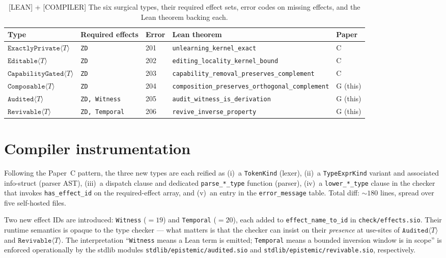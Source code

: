 \documentclass{article}
\newcommand{\ExactlyPrivate}[1]{\texttt{ExactlyPrivate}\langle #1 \rangle}
\newcommand{\Editable}[1]{\texttt{Editable}\langle #1 \rangle}
\newcommand{\CapabilityGated}[1]{\texttt{CapabilityGated}\langle #1 \rangle}
\newcommand{\Composable}[1]{\texttt{Composable}\langle #1 \rangle}
\newcommand{\Audited}[1]{\texttt{Audited}\langle #1 \rangle}
\newcommand{\Revivable}[1]{\texttt{Revivable}\langle #1 \rangle}
\begin{document}
\begin{table}[h]
\centering
\caption{[LEAN] + [COMPILER] The six surgical types, their required effect sets, error codes
         on missing effects, and the Lean theorem backing each.}
\label{tab:types}
\begin{tabular}{lllll}
\toprule
Type & Required effects & Error & Lean theorem & Paper \\
\midrule
$\ExactlyPrivate{T}$ & \texttt{ZD}            & 201 & \texttt{unlearning\_kernel\_exact}                  & C \\
$\Editable{T}$       & \texttt{ZD}            & 202 & \texttt{editing\_locality\_kernel\_bound}           & C \\
$\CapabilityGated{T}$& \texttt{ZD}            & 203 & \texttt{capability\_removal\_preserves\_complement} & C \\
$\Composable{T}$     & \texttt{ZD}            & 204 & \texttt{composition\_preserves\_orthogonal\_complement} & G (this) \\
$\Audited{T}$        & \texttt{ZD, Witness}   & 205 & \texttt{audit\_witness\_is\_derivation}             & G (this) \\
$\Revivable{T}$      & \texttt{ZD, Temporal}  & 206 & \texttt{revive\_inverse\_property}                  & G (this) \\
\bottomrule
\end{tabular}
\end{table}

\section{Compiler instrumentation}

Following the Paper~C pattern, the three new types are each reified
as (i)~a \texttt{TokenKind} (lexer), (ii)~a \texttt{TypeExprKind}
variant and associated info-struct (parser AST), (iii)~a dispatch clause
and dedicated \texttt{parse\_*\_type} function (parser), (iv)~a
\texttt{lower\_*\_type} clause in the checker that invokes
\texttt{has\_effect\_id} on the required-effect array, and (v)~an entry
in the \texttt{error\_message} table.  Total diff: $\sim 180$ lines,
spread over five self-hosted files.

Two new effect IDs are introduced:
\texttt{Witness} ($=19$) and \texttt{Temporal} ($=20$), each added to
\texttt{effect\_name\_to\_id} in \texttt{check/effects.sio}.  Their
runtime semantics is opaque to the type checker --- what matters is
that the checker can insist on their \emph{presence} at use-sites of
$\Audited{T}$ and $\Revivable{T}$.  The interpretation ``\texttt{Witness}
means a Lean term is emitted; \texttt{Temporal} means a bounded
inversion window is in scope'' is enforced operationally by the
stdlib modules \texttt{stdlib/epistemic/audited.sio} and
\texttt{stdlib/epistemic/revivable.sio}, respectively.
\end{document}
